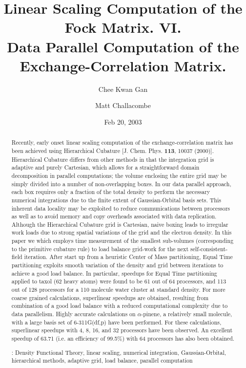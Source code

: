 \commentoutA{\documentclass[prl,aps,twocolumn,showpacs,twocolumngrid,superbib]{revtex4}}
\begin{document}
\title[Short Title]{ Linear Scaling Computation of the Fock Matrix. VI. \\ 
                     Data Parallel Computation of the Exchange-Correlation Matrix.\footnotemark[4] }

\author{Chee Kwan Gan\footnotemark[2]}
\author{Matt Challacombe\footnotemark[3]}
 


\date{Feb 20, 2003}

\begin{abstract}
Recently, early onset linear scaling computation of the
exchange-correlation matrix has been achieved using Hierarchical
Cubature [J. Chem. Phys. {\bf 113}, 10037 (2000)]. Hierarchical
Cubature differs from other methods in that the integration grid is
adaptive and purely Cartesian, which allows for a straightforward
domain decomposition in parallel computations; the volume enclosing
the entire grid may be simply divided into a number of non-overlapping
boxes. In our data parallel approach, each box requires only a fraction 
of the total density to perform the necessary numerical integrations
due to the finite extent of Gaussian-Orbital basis sets.  This inherent 
data locality may be exploited to reduce communications between processors 
as well as to avoid memory and copy overheads associated with data 
replication.  Although the Hierarchical Cubature grid is Cartesian, 
naive boxing leads to irregular work loads due to strong spatial variations 
of the grid and the electron density.  In this paper we
which employs time measurement of the smallest sub-volumes
(corresponding to the primitive cubature rule) to load balance
grid-work for the next self-consistent-field iteration.  After start
up from a heuristic Center of Mass partitioning, Equal Time
partitioning exploits smooth variation of the density and grid between
iterations to achieve a good load balance. In particular, speedups for
Equal Time partitioning applied to taxol (62 heavy atoms) were found
to be 61 out of 64 processors, and 113 out of 128 processors for a 110
molecule water cluster at standard density.  For more coarse grained
calculations, superlinear speedups are obtained, resulting from
combination of a good load balance with a reduced computational
complexity due to data parallelism.
Highly accurate calculations on $\alpha$-pinene, a relatively small molecule,
with a large basis set of 6-311G(df,p) have been performed.
For these calculations, superlinear speedups with 4, 
8, 16, and 32 processors have been observed.
An excellent speedup of 63.71 (i.e. an efficiency of 99.5\%) with 64 processors
has also been obtained.

\smallskip
{}: Density Functional Theory, linear scaling, numerical integration, Gaussian-Orbital, 
                         hierarchical methods, adaptive grid, load balance, parallel computation
\end{abstract}
\end{document}
